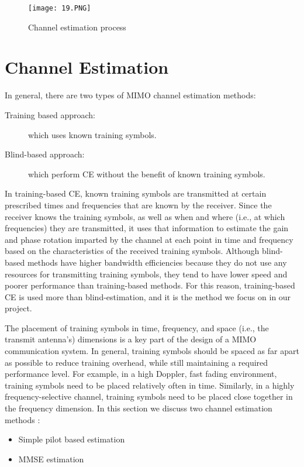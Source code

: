 \begin{figure}[h]
\centering
\texttt{[image: 19.PNG]}
\caption{Channel estimation process }
\end{figure}

\section{Channel Estimation}
In general, there are two types of MIMO channel estimation methods:
\begin{description}
    \item[Training based approach:] which uses known training symbols.
    \item[Blind-based approach:] which perform CE without the benefit of known training symbols.
\end{description}
In training-based CE, known training symbols are transmitted at certain prescribed times and frequencies that are known by the receiver. Since the receiver knows the training symbols, as well as when and where (i.e., at which frequencies) they are transmitted, it uses that information to estimate the gain and phase rotation imparted by the channel at each point in time and frequency based on the characteristics of the received training symbols. Although blind-based methods have higher bandwidth efficiencies because they do not use any resources for transmitting training symbols, they tend to have lower speed and poorer performance than training-based methods. For this reason, training-based CE is used more than blind-estimation, and it is the method we focus on in our project.

The placement of training symbols in time, frequency, and space (i.e., the transmit antenna’s) dimensions is a key part of the design of a MIMO communication system.
In general, training symbols should be spaced as far apart as possible to reduce training overhead, while still maintaining a required performance level. For example, in a high Doppler, fast fading environment, training symbols need to be placed relatively often in time. Similarly, in a highly frequency-selective channel, training symbols need to be placed close together in the frequency dimension.
In this section we discuss two channel estimation methods :
\begin{itemize}
    \item Simple pilot based estimation
    \item MMSE estimation
\end{itemize}

